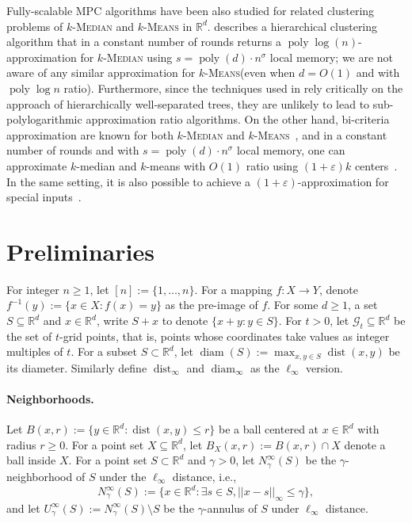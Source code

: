 \documentclass[11pt,letterpaper]{article}
\theoremstyle{plain}
\theoremstyle{definition}
\theoremstyle{remark}
\newcommand{\ProblemName}[1]{\textsc{#1}}
\newcommand{\kMedian}{$k$-\ProblemName{Median}\xspace}
\newcommand{\kMeans}{$k$-\ProblemName{Means}\xspace}
\DeclareMathOperator{\poly}{poly}
\DeclareMathOperator{\dist}{dist}
\DeclareMathOperator{\diam}{diam}
\renewcommand{\epsilon}{\ensuremath{\varepsilon}}
\let\epsilon\varepsilon
\begin{document}
Fully-scalable MPC algorithms have been also studied for related clustering problems of \kMedian and \kMeans in $\mathbb{R}^d$. \cite{Cohen-AddadLNSS21} describes a hierarchical clustering algorithm that in a constant number of rounds returns a $\poly\log (n)$-approximation for \kMedian using $s = \poly(d) \cdot n^{\sigma}$ local memory; we are not aware of any similar approximation for \kMeans (even when $d = O(1)$ and with $\poly\log n$ ratio). Furthermore, since the techniques used in \cite{Cohen-AddadLNSS21} rely critically on the approach of hierarchically well-separated trees, they are unlikely to lead to sub-polylogarithmic approximation ratio algorithms.
On the other hand, bi-criteria approximation are known for both \kMedian and \kMeans~\cite{BhaskaraW18,CGJKV24}, and in a constant number of rounds and with $s = \poly(d) \cdot n^{\sigma}$ local memory, one can approximate $k$-median and $k$-means with $O(1)$ ratio using $(1 + \epsilon)k$ centers~\cite{CGJKV24}. In the same setting, it is also possible to achieve a $(1 + \epsilon)$-approximation for special inputs~\cite{Cohen-AddadMZ22}.


    
     \section{Preliminaries}
\label{sec:prelim}

For integer $n \geq 1$, let $[n] := \{1, \ldots, n\}$. 
For a mapping $f : X \to Y$, denote $f^{-1}(y) := \{x \in X: f(x) = y\}$ as the pre-image of $f$. 
For some $d \geq 1$, a set $S \subseteq \mathbb{R}^d$ and $x \in \mathbb{R}^d$,
write $S + x$ to denote $\{ x + y : y \in S \}$.
For $t > 0$, let $\mathcal{G}_t \subseteq \mathbb{R}^d$ be the set of $t$-grid points, that is, points whose coordinates take values as integer multiples of $t$. 
For a subset $S \subset \mathbb{R}^d$, let $\diam(S) := \max_{x, y\in S} \dist(x, y)$ be its diameter.
Similarly define $\dist_\infty$ and $\diam_\infty$ as the $\ell_\infty$ version.







\paragraph{Neighborhoods.}
Let $B(x, r):=\{y\in \mathbb{R}^{d}: \dist(x,y)\leq r\}$ be a ball centered at $x\in \mathbb{R}^{d}$ with radius $r\geq 0$.
For a point set $X\subseteq\mathbb{R}^{d}$, let $B_{X}(x, r):= B(x, r)\cap X$ denote a ball inside $X$.
For a point set $S\subset \mathbb{R}^{d}$ and $\gamma>0$, let $N_{\gamma}^{\infty}(S)$ be the $\gamma$-neighborhood of $S$ under the $\ell_{\infty}$ distance, i.e., 
$$N_{\gamma}^{\infty}(S):= \{x\in\mathbb{R}^{d}: \exists s\in S, ||x-s||_{\infty}\leq \gamma\},$$ 
and let $U_{\gamma}^{\infty}(S):= N_{\gamma}^{\infty}(S)\setminus S$ be the $\gamma$-annulus of $S$ under $\ell_{\infty}$ distance. 
\end{document}
